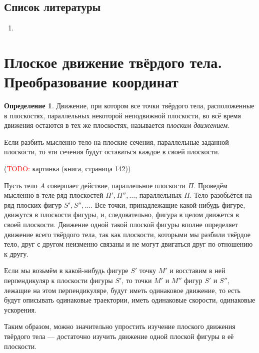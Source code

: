 \documentclass{article}
\theoremstyle{definition}
\newtheorem{definition}{Определение}[section]
\theoremstyle{plain}
\theoremstyle{remark}
\numberwithin{equation}{section}
\begin{document}
\subsection{Список литературы}
\begin{enumerate}
  \item \cite{lourie}
\end{enumerate}

\pagebreak


\section{Плоское движение твёрдого тела. Преобразование координат}

\begin{definition}
  Движение, при котором все точки твёрдого тела, расположенные в плоскостях,
  параллельных некоторой неподвижной плоскости, во всё время движения остаются в
  тех же плоскостях, называется \textit{плоским движением}.

  Если разбить мысленно тело на плоские сечения, параллельные заданной
  плоскости, то эти сечения будут оставаться каждое в своей плоскости.

  (\textcolor{red}{TODO:} картинка (книга, страница 142))
\end{definition}

Пусть тело $A$ совершает действие, параллельное плоскости $\Pi$. Проведём
мысленно в теле ряд плоскостей $\Pi', \Pi'', \dots$, параллельных $\Pi$. Тело
разобьётся на ряд плоских фигур $S', S'', \dots$. Все точки, принадлежащие
какой-нибудь фигуре, движутся в плоскости фигуры, и, следовательно, фигура в
целом движется в своей плоскости. Движение одной такой плоской фигуры вполне
определяет движение всего твёрдого тела, так как плоскости, которыми мы разбили
твёрдое тело, друг с другом неизменно связаны и не могут двигаться друг по
отношению к другу.

Если мы возьмём в какой-нибудь фигуре $S'$ точку $M'$ и восставим в ней
перпендикуляр к плоскости фигуры $S'$, то точки $M'$ и $M''$ фигур $S'$ и $S''$,
лежащие на этом перпендикуляре, будут иметь одинаковое движение, то есть будут
описывать одинаковые траектории, иметь одинаковые скорости, одинаковые
ускорения.

Таким образом, можно значительно упростить изучение плоского движения твёрдого
тела --- достаточно изучить движение одной плоской фигуры в её плоскости.
\end{document}
